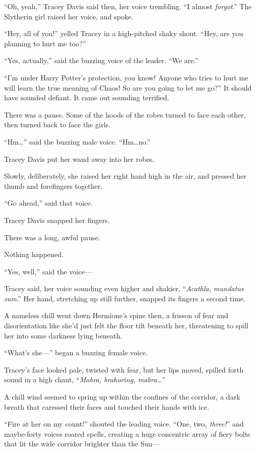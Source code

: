 “Oh, yeah,” Tracey Davis said then, her voice trembling. “I almost \emph{forgot}.” The Slytherin girl raised her voice, and spoke.

“Hey, all of you!” yelled Tracey in a high-pitched shaky shout. “Hey, are you planning to hurt me too?”

“Yes, actually,” said the buzzing voice of the leader. “We are.”

“I’m under Harry Potter’s protection, you know! Anyone who tries to hurt me will learn the true meaning of Chaos! So are you going to let me go?” It should have sounded defiant. It came out sounding terrified.

There was a pause. Some of the hoods of the robes turned to face each other, then turned back to face the girls.

“Hm…” said the buzzing male voice. “Hm…no.”

Tracey Davis put her wand away into her robes.

Slowly, deliberately, she raised her right hand high in the air, and pressed her thumb and forefingers together.

“Go ahead,” said that voice.

Tracey Davis snapped her fingers.

There was a long, awful pause.

Nothing happened.

“Yes, well,” said the voice—

Tracey said, her voice sounding even higher and shakier, “\emph{Acathla, mundatus sum}.” Her hand, stretching up still further, snapped its fingers a second time.

A nameless chill went down Hermione’s spine then, a frisson of fear and disorientation like she’d just felt the floor tilt beneath her, threatening to spill her into some darkness lying beneath.

“What’s she—” began a buzzing female voice.

Tracey’s face looked pale, twisted with fear, but her lips moved, spilled forth sound in a high chant, “\emph{Mabra, brahoring, mabra…}”

A chill wind seemed to spring up within the confines of the corridor, a dark breath that caressed their faces and touched their hands with ice.

“Fire at her on my count!” shouted the leading voice. “One, two\emph{, three!}” and maybe-forty voices roared spells, creating a huge concentric array of fiery bolts that lit the wide corridor brighter than the Sun—


